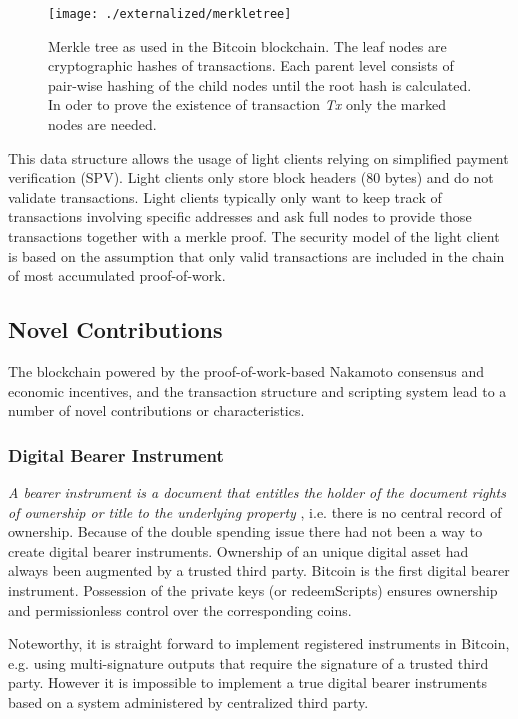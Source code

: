 \begin{figure}[!t]
    \centering
    \texttt{[image: ./externalized/merkletree]}
    \caption{Merkle tree as used in the Bitcoin blockchain. The leaf nodes are cryptographic hashes of transactions. Each parent level consists of pair-wise hashing of the child nodes until the root hash is calculated. In oder to prove the existence of transaction \emph{Tx} only the marked nodes are needed.}
    \label{fig:merkletree}
  \end{figure} 

  This data structure allows the usage of light clients relying on simplified payment verification (SPV). Light clients only store block headers (80 bytes) and do not validate transactions. Light clients typically only want to keep track of transactions involving specific addresses and ask full nodes to provide those transactions together with a merkle proof. The security model of the light client is based on the assumption that only valid transactions are included in the chain of most accumulated proof-of-work.  
 

\subsection{Novel Contributions}
\label{sec:btc_cont}

The blockchain powered by the proof-of-work-based Nakamoto consensus and economic incentives, and the transaction structure and scripting system lead to a number of novel contributions or characteristics. 

\subsubsection{Digital Bearer Instrument}

\emph{A bearer instrument is a document that entitles the holder of the document rights of ownership or title to the underlying property} \parencite{bearer}, i.e. there is no central record of ownership. Because of the double spending issue there had not been a way to create digital bearer instruments. Ownership of an unique digital asset had always been augmented by a trusted third party. Bitcoin is the first digital bearer instrument. Possession of the private keys (or redeemScripts) ensures ownership and permissionless control over the corresponding coins.

Noteworthy, it is straight forward to implement registered instruments in Bitcoin, e.g. using multi-signature outputs that require the signature of a trusted third party. However it is impossible to implement a true digital bearer instruments based on a system administered by centralized third party.

